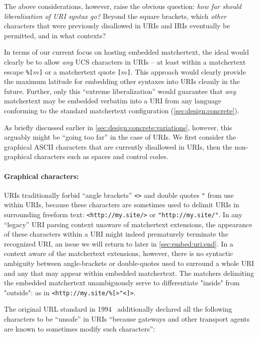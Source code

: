 The above considerations, however,
raise the obvious question:
\emph{how far should liberalization of URI syntax go?}
Beyond the square brackets,
which \emph{other} characters that were previously disallowed in URIs and IRIs
eventually be permitted, and in what contexts?

In terms of our current focus on hosting embedded matchertext,
the ideal would clearly be to allow \emph{any} UCS characters in URIs --
at least within a matchertext escape \verb|%[|$m$\verb|]|
or a matchertext quote \verb|[|$m$\verb|]|.
This approach would clearly provide the maximum latitude
for embedding other syntaxes into URIs cleanly in the future.
Further, only this ``extreme liberalization''
would guarantee that \emph{any} matchertext
may be embedded verbatim into a URI
from any language conforming to the standard matchertext configuration
(\cref{sec:design:concrete}).

As briefly discussed earlier in \cref{sec:design:concrete:variations},
however,
this arguably might be ``going too far'' in the case of URIs.
We first consider the graphical ASCII characters
that are currently disallowed in URIs,
then the non-graphical characters such as spaces and control codes.

\paragraph{Graphical characters:}

URIs traditionally forbid
``angle brackets'' \verb|<>| and double quotes \verb|"|
from use within URIs,
because these characters are sometimes
used to delimit URIs in surrounding freeform text:
\eg \verb|<http://my.site/>| or \verb|"http://my.site/"|.
In any ``legacy'' URI parsing context unaware of matchertext extensions,
the appearance of these characters within a URI might indeed
prematurely terminate the recognized URI,
an issue we will return to later in \cref{sec:embed:uri:end}.
In a context aware of the matchertext extensions, however,
there is no syntactic ambiguity between angle-brackets or double-quotes
used to surround a whole URI
and any that may appear within embedded matchertext.
The matchers delimiting the embedded matchertext
unambiguously serve to differentiate "inside" from "outside":
\eg as in \verb|<http://my.site/%[>"<]>|.

The original URL standard in 1994~\cite{rfc1738}
additionally declared all the following characters 
to be ``unsafe'' in URIs 
``because gateways and other transport agents are known to sometimes modify
such characters'':

